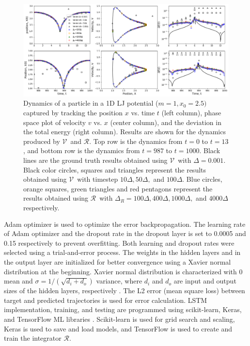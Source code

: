 \documentclass[aps,prl,twocolumn,superscriptaddress,tightenlines,longbibliography, reprint]{revtex4-1}
\newcommand{\R}{$\mathscr{R}$}
\newcommand{\V}{$\mathscr{V}$}
\begin{document}
\begin{figure}[htb]
\centering
\includegraphics[width=1.0\textwidth]{figures/fig8.png}
\caption{Dynamics of a particle in a 1D LJ potential ($m=1, x_0=2.5)$ captured by tracking the position $x$ vs. time $t$ (left column), phase space plot of velocity $v$ vs. $x$ (center column), and the deviation in the total energy (right column). Results are shown for the dynamics produced by \V\ and \R. Top row is the dynamics from $t=0$ to $t=13$, and bottom row is the dynamics from $t=987$ to $t=1000$. Black lines are the ground truth results obtained using \V\ with $\Delta=0.001$. Black color circles, squares and triangles represent the results obtained using \V\ with timestep $10\Delta, 50\Delta,$ and $100\Delta$. Blue circles, orange squares, green triangles and red pentagons represent the results obtained using \R\ with $\Delta_{R}=100\Delta, 400\Delta, 1000\Delta,$ and $4000\Delta$ respectively.}
\label{fig:phasespace}
\end{figure}

Adam optimizer is used to optimize the error backpropagation. The learning rate of Adam optimizer and the dropout rate in the dropout layer is set to  0.0005 and 0.15 respectively to prevent overfitting. Both learning and dropout rates were selected using a trial-and-error process. The weights in the hidden layers and in the output layer are initialized for better convergence using a Xavier normal distribution at the beginning. Xavier normal distribution is characterized with $0$ mean and $\sigma = 1/(\sqrt{d_i + d_o})$ variance, where $d_i$ and $d_o$ are input and output sizes of the hidden layers, respectively \cite{glorot2010understanding}. The L2 error (mean square loss) between target and predicted trajectories is used for error calculation. LSTM implementation, training, and testing are programmed using scikit-learn, Keras, and TensorFlow ML libraries \cite{chollet2015keras,buitinck2013api,abadi2016tensorflow}. Scikit-learn is used for grid search and scaling, Keras is used to save and load models, and TensorFlow is used to create and train the integrator $\mathscr{R}$. 
\end{document}
